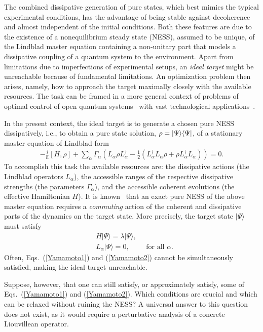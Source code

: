 \documentclass[aps,pra,letterpaper,twocolumn,showpacs,superscriptaddress,floatfix,longbibliography]{revtex4-1}
\begin{document}
The combined dissipative generation of pure states, which best mimics
the typical experimental conditions, has the advantage of being stable
against decoherence and almost independent of the initial conditions.
Both these features are due to the existence of a nonequilibrium
steady state (NESS), assumed to be unique, of the Lindblad master
equation containing a non-unitary part that models a dissipative
coupling of a quantum system to the environment.  Apart from
limitations due to imperfections of experimental setups, an
\textit{ideal target} might be unreachable because of fundamental
limitations. An optimization problem then arises, namely, how to
approach the target maximally closely with the available resources.
The task can be framed in a more general context of problems of
optimal control of open quantum systems~\cite{Dirr2009} with vast
technological applications~\cite{Glaser2015}.

In the present context, the ideal target is to generate a chosen pure
NESS dissipatively, i.e., to obtain a pure state solution,
$\rho=|{\Psi}\rangle\langle{\Psi}|$, of a stationary master equation of
Lindblad form~\cite{Lindblad,GKS}
\begin{align*}
  -\frac{i}{\hbar} \left[H,\rho\right] + \sum_{\alpha} \Gamma_{\alpha}
  \left( L_{\alpha} \rho L_{\alpha}^\dag - \frac{1}{2} \left(
      L_{\alpha}^\dag L_{\alpha} \rho + \rho L_{\alpha}^\dag
      L_{\alpha} \right) \right)=0.
\end{align*}
To accomplish this task the available resources are: the dissipative
actions (the Lindblad operators $L_{\alpha}$), the accessible ranges
of the respective dissipative strengths (the parameters
$\Gamma_{\alpha}$), and the accessible coherent evolutions (the
effective Hamiltonian $H$).  It is known~\cite{Yamamoto05,ZollerPRA08}
that an exact pure NESS of the above master equation requires a
\textit{commuting} action of the coherent and dissipative parts of the
dynamics on the target state.  More precisely, the target state $|
\Psi \rangle$ must satisfy
\begin{align}
  &H | \Psi \rangle = \lambda | \Psi \rangle, \label{Yamamoto1}\\
  &L_\alpha | \Psi \rangle =0, \qquad \mbox{ for all $\alpha$}.
  \label{Yamamoto2}
\end{align}
Often, Eqs.~(\ref{Yamamoto1}) and (\ref{Yamamoto2}) cannot be
simultaneously satisfied, making the ideal target unreachable.

Suppose, however, that one can still satisfy, or approximately
satisfy, some of Eqs.~(\ref{Yamamoto1}) and (\ref{Yamamoto2}). Which
conditions are crucial and which can be relaxed without ruining the
NESS? A universal answer to this question does not exist, as it would
require a perturbative analysis of a concrete Liouvillean operator.
\end{document}
